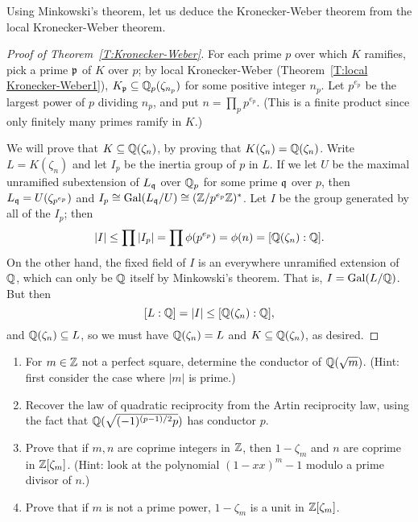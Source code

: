 Using Minkowski's theorem, let us deduce the Kronecker-Weber theorem from the local Kronecker-Weber theorem.
\begin{proof}[Proof of Theorem~\ref{T:Kronecker-Weber}]
For each prime $p$ over which $K$ ramifies,
pick a prime $\mathfrak{p}$ of $K$ over $p$; by local Kronecker-Weber
(Theorem~\ref{T:local Kronecker-Weber1}),
$K_{\mathfrak{p}} \subseteq \mathbb{Q}_p(\zeta_{n_p})$ for some positive integer $n_p$.
Let $p^{e_p}$ be the largest power of $p$ dividing $n_p$, and put 
$n = \prod_p p^{e_p}$. (This is a finite product since only finitely many
primes ramify in $K$.) 

We will prove that $K \subseteq \mathbb{Q}(\zeta_n)$, by proving that
$K(\zeta_n) = \mathbb{Q}(\zeta_n)$. Write $L = K(\zeta_n)$
and let $I_p$ be the inertia group of $p$ in $L$. If we let
$U$ be the maximal unramified subextension of $L_{\mathfrak{q}}$ over $\mathbb{Q}_p$
for some prime $\mathfrak{q}$ over $p$, then $L_{\mathfrak{q}} = U(\zeta_{p^{e_p}})$
and $I_p \cong \operatorname{Gal}(L_{\mathfrak{q}}/U) \cong (\mathbb{Z}/p^{e_p}\mathbb{Z})^*$.
Let $I$ be the group generated by all of the $I_p$; then
\[
|I| \leq \prod |I_p| = \prod \phi(p^{e_p}) = \phi(n) = [\mathbb{Q}(\zeta_n):\mathbb{Q}].
\]
On the other hand, the fixed field of $I$ is an everywhere unramified extension of 
$\mathbb{Q}$, which can only be $\mathbb{Q}$ itself by Minkowski's theorem. That is,
$I = \operatorname{Gal}(L/\mathbb{Q})$. But then
\[
[L:\mathbb{Q}] = |I| \leq [\mathbb{Q}(\zeta_n):\mathbb{Q}],
\]
and $\mathbb{Q}(\zeta_n) \subseteq L$, so we must have $\mathbb{Q}(\zeta_n) = L$
and $K \subseteq \mathbb{Q}(\zeta_n)$, as desired.
\end{proof}


\begin{enumerate}
\item
For $m \in \mathbb{Z}$
not a perfect square, determine the conductor of $\mathbb{Q}(\sqrt{m})$.
(Hint: first consider the case where $|m|$ is
prime.)
\item
Recover the law of quadratic reciprocity from the Artin reciprocity law,
using the fact that $\mathbb{Q}(\sqrt{(-1)^{(p-1)/2} p})$ has conductor $p$.
\item
Prove that if $m,n$ are coprime integers in $\mathbb{Z}$, then
$1 - \zeta_m$ and $n$ are coprime in $\mathbb{Z}[\zeta_m]$.
(Hint: look at the polynomial $(1-xx)^m-1$ modulo
a prime divisor of $n$.)
\item
Prove that if $m$ is not a prime power, $1-\zeta_m$ is
a unit in $\mathbb{Z}[\zeta_m]$.
\end{enumerate}

%


